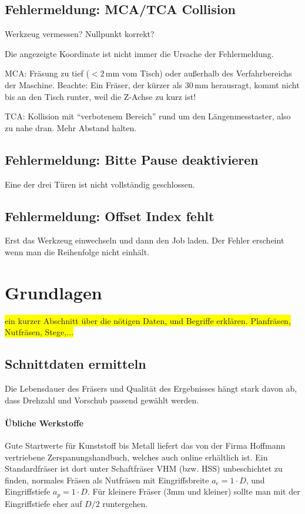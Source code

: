 \documentclass{\basedir/fablab-document}
\renewcommand{\todo}[1]{\colorbox{yellow}{{#1}}}
\begin{document}
\subsection{Fehlermeldung: MCA/TCA Collision}
Werkzeug vermessen? Nullpunkt korrekt?

Die angezeigte Koordinate ist nicht immer die Ursache der Fehlermeldung.

MCA: Fräsung zu tief ($<2$\,mm vom Tisch) oder außerhalb des Verfahrbereichs der Maschine. Beachte: Ein Fräser, der kürzer als 30\,mm herausragt, kommt nicht bis an den Tisch runter, weil die Z-Achse zu kurz ist!

TCA: Kollision mit \enquote{verbotenem Bereich} rund um den Längenmesstaster, also zu nahe dran. Mehr Abstand halten.

\subsection{Fehlermeldung: Bitte Pause deaktivieren}
Eine der drei Türen ist nicht vollständig geschlossen.

\subsection{Fehlermeldung: Offset Index fehlt}
Erst das Werkzeug einwechseln und dann den Job laden. Der Fehler erscheint wenn man die Reihenfolge nicht einhält.

\section{Grundlagen}
\todo{ein kurzer Abschnitt über die nötigen Daten, und Begriffe erklären. Planfräsen, Nutfräsen, Stege,...}

\subsection{Schnittdaten ermitteln}

Die Lebensdauer des Fräsers und Qualität des Ergebnisses hängt stark davon ab, dass Drehzahl und Vorschub passend gewählt werden.

\paragraph{Übliche Werkstoffe} Gute Startwerte für Kunststoff bis Metall liefert das von der Firma Hoffmann vertriebene Zerspanungshandbuch, welches auch online erhältlich ist. Ein Standardfräser ist dort unter Schaftfräser VHM (bzw. HSS) unbeschichtet zu finden, normales Fräsen als Nutfräsen mit Eingriffsbreite $a_e=1\cdot D$, und Eingriffstiefe $a_p=1 \cdot D$. Für kleinere Fräser (3mm und kleiner) sollte man mit der Eingriffstiefe eher auf $D/2$ runtergehen.
\end{document}
